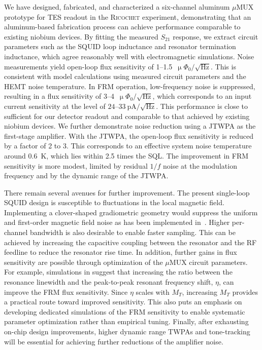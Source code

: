 \documentclass[
 prd,
 reprint,
 superscriptaddress,
 amsmath,amssymb,
 aps,
 floatfix,
]{revtex4-2}
\newcommand{\ricochet}{\textsc{Ricochet}\xspace}
\newcommand{\uMUX}{$\mu$MUX\xspace}
\newcommand{\uPhirtHz}{$\upmu \Phi_0/\sqrt{\text{Hz}}$\xspace}
\begin{document}
We have designed, fabricated, and characterized a six-channel aluminum \uMUX prototype for TES readout in the \ricochet experiment, demonstrating that an aluminum-based fabrication process can achieve performance comparable to existing niobium devices. By fitting the measured $S_{21}$ response, we extract circuit parameters such as the SQUID loop inductance and resonator termination inductance, which agree reasonably well with electromagnetic simulations. Noise measurements yield open-loop flux sensitivity of 1--1.5~\uPhirtHz. This is consistent with model calculations using measured circuit parameters and the HEMT noise temperature. In FRM operation, low-frequency noise is suppressed, resulting in a flux sensitivity of 3--4~\uPhirtHz, which corresponds to an input current sensitivity at the level of $24$--$33~\mathrm{pA}/\sqrt{\mathrm{Hz}}$. This performance is close to sufficient for our detector readout and comparable to that achieved by existing niobium devices. We further demonstrate noise reduction using a JTWPA as the first-stage amplifier. With the JTWPA, the open-loop flux sensitivity is reduced by a factor of 2 to 3. This corresponds to an effective system noise temperature around \qty{0.6}{\K}, which lies within 2.5 times the SQL. The improvement in FRM sensitivity is more modest, limited by residual $1/f$ noise at the modulation frequency and by the dynamic range of the JTWPA.

There remain several avenues for further improvement. The present single-loop SQUID design is susceptible to fluctuations in the local magnetic field. Implementing a clover-shaped gradiometric geometry would suppress the uniform and first-order magnetic field noise as has been implemented in~\cite{kempf_design_2017, mates_microwave_2011}. Higher per-channel bandwidth is also desirable to enable faster sampling. This can be achieved by increasing the capacitive coupling between the resonator and the RF feedline to reduce the resonator rise time. In addition, further gains in flux sensitivity are possible through optimization of the \uMUX circuit parameters. For example, simulations in \cite{schuster_simulation_2023} suggest that increasing the ratio between the resonance linewidth and the peak-to-peak resonant frequency shift, $\eta$, can improve the FRM flux sensitivity. Since $\eta$ scales with $M_T$, increasing $M_T$ provides a practical route toward improved sensitivity. This also puts an emphasis on developing dedicated simulations of the FRM sensitivity to enable systematic parameter optimization rather than empirical tuning. Finally, after exhausting on-chip design improvements, higher dynamic range TWPAs and tone-tracking will be essential for achieving further reductions of the amplifier noise.
\end{document}
